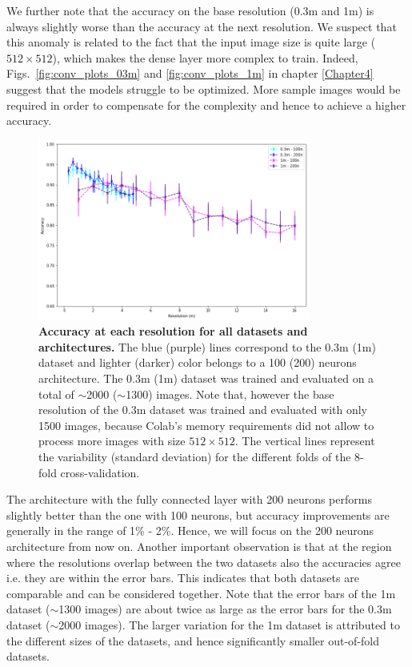 We further note that the accuracy on the base resolution (0.3m and 1m) is always slightly worse than the accuracy at the next resolution. We suspect that this anomaly is related to the fact that the input image size is quite large ($512\times512$), which makes the dense layer more complex to train. Indeed, Figs.~\ref{fig:conv_plots_03m} and \ref{fig:conv_plots_1m} in chapter \ref{Chapter4} suggest that the models struggle to be optimized. More sample images would be required in order to compensate for the complexity and hence to achieve a higher accuracy.

\begin{figure}[h!]
	\centering
	\includegraphics[width=0.8\textwidth]{Figures/results/acc_res_03m_1m.png}
	\captionsetup{width=1\linewidth}
	\caption{\textbf{Accuracy at each resolution for all datasets and architectures.} The blue (purple) lines correspond to the 0.3m (1m) dataset and lighter (darker) color belongs to a 100 (200) neurons architecture. The 0.3m (1m) dataset was trained and evaluated on a total of $\sim$2000 ($\sim$1300) images. Note that, however the base resolution of the 0.3m dataset was trained and evaluated with only 1500 images, because Colab's memory requirements did not allow to process more images with size $512\times512$. The vertical lines represent the variability (standard deviation) for the different folds of the 8-fold cross-validation.}
	\label{fig:acc_res_03m_1m}
\end{figure}

The architecture with the fully connected layer with 200 neurons performs slightly better than the one with 100 neurons, but accuracy improvements are generally in the range of 1\% - 2\%. Hence, we will focus on the 200 neurons architecture from now on. Another important observation is that at the region where the resolutions overlap between the two datasets also the accuracies agree i.e. they are within the error bars. This indicates that both datasets are comparable and can be considered together.
Note that the error bars of the 1m dataset ($\sim$1300 images) are about twice as large as the error bars for the 0.3m dataset ($\sim$2000 images). The larger variation for the 1m dataset is attributed to the different sizes of the datasets, and hence significantly smaller out-of-fold datasets.

